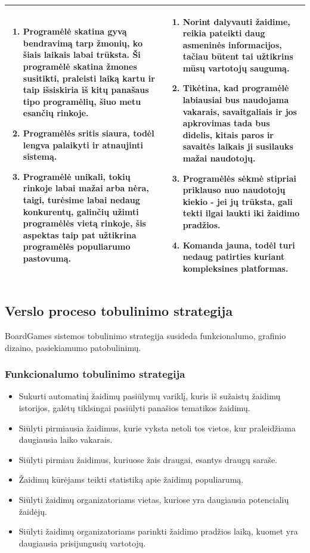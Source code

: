 \documentclass{VUMIFPSkursinis}
\begin{document}
\begin{longtable}{ | m{8cm} | m{8cm} | }
\begin{enumerate}
					\item Programėlė skatina gyvą bendravimą tarp žmonių, ko šiais laikais labai trūksta. Ši programėlė skatina žmones susitikti, praleisti laiką kartu ir taip išsiskiria iš kitų panašaus tipo programėlių, šiuo metu esančių rinkoje.
					\item Programėlės sritis siaura, todėl lengva palaikyti ir atnaujinti sistemą.
					\item Programėlė unikali, tokių rinkoje labai mažai arba nėra, taigi, turėsime labai nedaug konkurentų, galinčių užimti programėlės vietą rinkoje, šis aspektas taip pat užtikrina programėlės populiarumo pastovumą.
				\end{enumerate}
					& 
				\begin{enumerate}
					\item Norint dalyvauti žaidime, reikia pateikti daug asmeninės informacijos, tačiau būtent tai užtikrins mūsų vartotojų saugumą.
					\item Tikėtina, kad programėlė labiausiai bus naudojama vakarais, savaitgaliais ir jos apkrovimas tada bus didelis, kitais paros ir savaitės laikais ji susilauks mažai naudotojų.
					\item Programėlės sėkmė stipriai priklauso nuo naudotojų kiekio - jei jų trūksta, gali tekti ilgai laukti iki žaidimo pradžios. 
					\item Komanda jauna, todėl turi nedaug patirties kuriant kompleksines platformas.
				\end{enumerate}\tabularnewline \hline
			\end{longtable}
			
\subsection{Verslo proceso tobulinimo strategija}
BoardGames sistemos tobulinimo strategija susideda funkcionalumo, 
grafinio dizaino, pasiekiamumo patobulinimų.
	\subsubsection {Funkcionalumo tobulinimo strategija}
		\renewcommand{\labelitemi}{$\bullet$}
			\begin{itemize}
				\item Sukurti automatinį žaidimų pasiūlymų variklį, kuris iš sužaistų žaidimų istorijos, galėtų tiklsingai pasiūlyti panašios tematikos žaidimų.
				\item Siūlyti pirmiausia žaidimus, kurie vyksta netoli tos vietos, kur praleidžiama daugiausia laiko vakarais.
				\item Siūlyti pirmiau žaidimus, kuriuose žais draugai, esantys draugų saraše. 
				\item Žaidimų kūrėjams teikti statistiką apie žaidimų populiarumą.
				\item Siūlyti žaidimų organizatoriams vietas, kuriose yra daugiausia potencialių žaidėjų.
				\item Siūlyti žaidimų organizatoriams parinkti žaidimo pradžios laiką, kuomet yra daugiausia prisijungusių vartotojų.
			\end{itemize}
\end{document}
